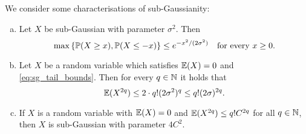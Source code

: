 \begin{proposition}We consider some characterisations of sub-Gaussianity: 
    \begin{enumerate}[(a)]
        \item     Let $X$ be sub-Gaussian with parameter $\sigma^2$. Then 
        \begin{equation} \label{eq:sg_tail_bounds}
        \max\qty{\mathbb P(X \geq x), \mathbb P(X \leq -x)} \leq e^{-x^2/(2\sigma^2)} \quad\text{for every $x \geq 0$}.
        \end{equation}
        
        \item Let $X$ be a random variable which satisfies $\mathbb E(X) = 0$ and \cref{eq:sg_tail_bounds}. Then for every $q \in \mathbb N$ it holds that
        \[
        \mathbb E(X^{2q}) \leq 2 \cdot q! (2\sigma^2)^q \leq q! (2\sigma)^{2q}.
        \]
        
        \item If $X$ is a random variable with $\mathbb E(X) = 0$ and $\mathbb E(X^{2q}) \leq q! C^{2q}$ for all $q \in \mathbb N$, then $X$ is sub-Gaussian with parameter $4C^2$. 
    \end{enumerate}

\end{proposition}


